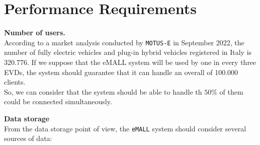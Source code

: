 \section{Performance Requirements}
\label{sec:performance_requirements}%
\textbf{Number of users.} \\
According to a market analysis conducted by \verb|MOTUS-E| in September 2022,
the number of fully electric vehicles and plug-in hybrid vehicles registered in Italy is 320.776.
If we suppose that the eMALL system will be used by one in every three EVDs,
the system should guarantee that it can handle an overall of 100.000 clients. \\
So, we can consider that the system should be able to handle th $50\%$ of them could be connected simultaneously.

\textbf{Data storage} \\
From the data storage point of view, the \verb|eMALL| system should consider several sources of data:
